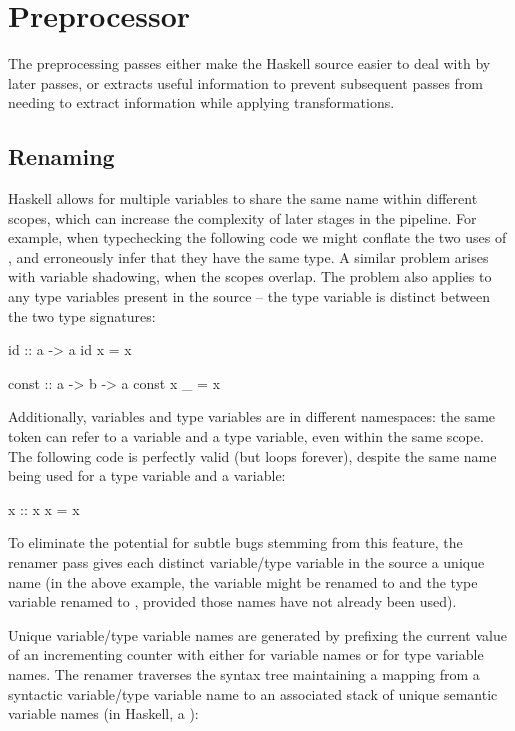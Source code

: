 \documentclass[dissertation.tex]{subfiles}
\begin{document}
\section{Preprocessor}
{
    The preprocessing passes either make the Haskell source easier to deal with by later passes, or extracts useful information to prevent subsequent passes from needing to extract information while applying transformations.

    \subsection{Renaming}
    {
        Haskell allows for multiple variables to share the same name within different scopes, which can increase the complexity of later stages in the pipeline. For example, when typechecking the following code we might conflate the two uses of , and erroneously infer that they have the same type. A similar problem arises with variable shadowing, when the scopes overlap. The problem also applies to any type variables present in the source -- the type variable  is distinct between the two type signatures:

        \begin{haskellfigure}
        id :: a -> a
        id x = x

        const :: a -> b -> a
        const x _ = x
        \end{haskellfigure}

        Additionally, variables and type variables are in different namespaces: the same token can refer to a variable and a type variable, even within the same scope. The following code is perfectly valid (but loops forever), despite the same name being used for a type variable and a variable:

        \begin{haskellfigure}
        x :: x
        x = x
        \end{haskellfigure}

        To eliminate the potential for subtle bugs stemming from this feature, the renamer pass gives each distinct variable/type variable in the source a unique name (in the above example, the variable  might be renamed to  and the type variable renamed to , provided those names have not already been used).
        
        Unique variable/type variable names are generated by prefixing the current value of an incrementing counter with either  for variable names or  for type variable names. The renamer traverses the syntax tree maintaining a mapping from a syntactic variable/type variable name to an associated stack of unique semantic variable names (in Haskell, a ):

}}
\end{document}

